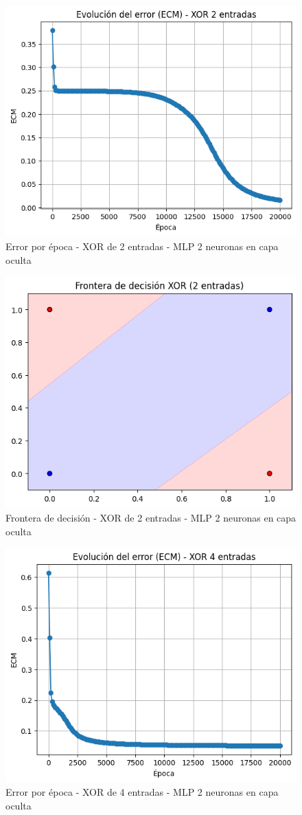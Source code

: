 \documentclass[11pt]{article} %
\begin{document}
\begin{figure}[htbp!]
	\centering
	\includegraphics[width=0.7\linewidth]{"../imgs/ej3/2 neur int/xor2_err"}
	\caption{Error por época - XOR de 2 entradas - MLP 2 neuronas en capa oculta}
	\label{fig:xor2err}
\end{figure}

\begin{figure}[htbp!]
	\centering
	\includegraphics[width=0.7\linewidth]{"../imgs/ej3/2 neur int/xor2_front"}
	\caption{Frontera de decisión - XOR de 2 entradas - MLP 2 neuronas en capa oculta}
	\label{fig:xor2front}
\end{figure}

\begin{figure}[htbp!]
	\centering
	\includegraphics[width=0.7\linewidth]{"../imgs/ej3/2 neur int/xor4_err"}
	\caption{Error por época - XOR de 4 entradas - MLP 2 neuronas en capa oculta}
	\label{fig:xor4err}
\end{figure}
\end{document}
